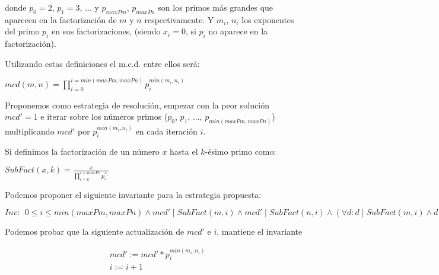 \documentclass[12pt, a4paper, openany, fleqn]{book}
\begin{document}
    donde $p_0=2$, $p_1= 3$, ... y $p_{maxPm}$, $p_{maxPn}$ son los primos más grandes que aparecen en la factorización de $m$ y $n$ respectivamente. Y $m_i$, $n_i$ los exponentes del primo $p_i$ en sus factorizaciones, (siendo $x_i=0$, si $p_i$ no aparece en la factorización).

    Utilizando estas definiciones el m.c.d. entre ellos será:

    \begin{center}
        \begin{math}
            mcd(m, n) = \prod_{i=0}^{i=min(maxPm, maxPn)} p_{i}^{min(m_i, n_i)}
        \end{math}
    \end{center}

    Proponemos como estrategia de resolución, empezar con la peor solución $mcd' = 1$ e iterar sobre los números primos ($p_0$, $p_1$, ..., $p_{min(maxPm, maxPn)}$) multiplicando $mcd'$ por $p_{i}^{min(m_{i}, n_{i})}$ en cada iteración $i$.

    Si definimos la factorización de un número $x$ hasta el $k$-ésimo primo como:
    \begin{center}
        \begin{math}
            SubFact(x, k) = \frac{x}{\prod_{i=k}^{i=maxPx} p_{i}^{x_i}} 
        \end{math}
    \end{center}

    Podemos proponer el siguiente invariante para la estrategia propuesta:
    \begin{center}
        \begin{math}
            Inv:\ \  0 \leqslant i \leqslant min(maxPm, maxPn) \land mcd' \mathrel{|} SubFact(m, i) \land mcd' \mathrel{|} SubFact(n, i) \land (\forall d: d \mathrel{|} SubFact(m, i) \land d \mathrel{|} SubFact(n, i) : d \leq mcd') 
        \end{math}
    \end{center}

    Podemos probar que la siguiente actualización de $mcd'$ e $i$, mantiene el invariante

    \begin{align*}
        & mcd' := mcd' * p_{i}^{min(m_{i}, n_{i})} \\
        & i := i + 1
    \end{align*}
\end{document}
